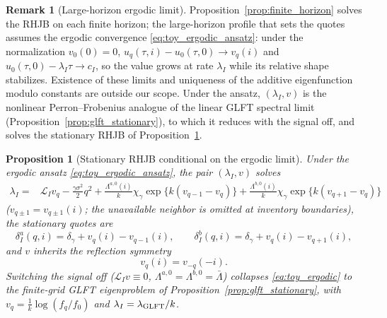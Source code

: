 \documentclass[11pt,a4paper]{article}
\newcommand{\Lcal}{\mathcal{L}}
\theoremstyle{plain}
\newtheorem{proposition}{Proposition}[section]
\theoremstyle{definition}
\newtheorem{remark}{Remark}[section]
\begin{document}
\begin{remark}[Large-horizon ergodic limit]
\label{rem:ergodic_existence}
Proposition~\ref{prop:finite_horizon} solves the RHJB on each finite horizon;
the large-horizon profile that sets the quotes assumes the ergodic convergence
\eqref{eq:toy_ergodic_ansatz}: under the normalization \(v_0(0)=0\),
\(u_q(\tau,i)-u_0(\tau,0)\to v_q(i)\) and \(u_0(\tau,0)-\lambda_I\tau\to c_I\),
so the value grows at rate \(\lambda_I\) while its relative shape stabilizes.
Existence of these limits and uniqueness of the additive eigenfunction modulo
constants are outside our scope.  Under the ansatz, \((\lambda_I,v)\) is the
nonlinear Perron--Frobenius analogue of the linear GLFT spectral limit
(Proposition~\ref{prop:glft_stationary}), to which it reduces with the signal
off, and solves the stationary RHJB of Proposition~\ref{prop:toy_ergodic}.
\end{remark}

\begin{proposition}[Stationary RHJB conditional on the ergodic limit]
\label{prop:toy_ergodic}
Under the ergodic ansatz \eqref{eq:toy_ergodic_ansatz}, the pair
\((\lambda_I,v)\) solves
\begin{align}
\lambda_I
={}&
\Lcal_Iv_q
-\frac{\gamma\sigma^2}{2}q^2
+\frac{\Lambda^{a,0}(i)}{k}\chi_\gamma\exp\{k(v_{q-1}-v_q)\}
+\frac{\Lambda^{b,0}(i)}{k}\chi_\gamma\exp\{k(v_{q+1}-v_q)\}
\label{eq:toy_ergodic}
\end{align}
(\(v_{q\pm1}=v_{q\pm1}(i)\); the unavailable neighbor is omitted at inventory
boundaries), the stationary quotes are
\begin{equation}
\delta_I^a(q,i)=\delta_\gamma+v_q(i)-v_{q-1}(i),
\qquad
\delta_I^b(q,i)=\delta_\gamma+v_q(i)-v_{q+1}(i),
\label{eq:toy_quote_recovery}
\end{equation}
and \(v\) inherits the reflection symmetry
\begin{equation}
v_q(i)=v_{-q}(-i).
\label{eq:toy_value_symmetry}
\end{equation}
Switching the signal off (\(\Lcal_I v\equiv0\),
\(\Lambda^{a,0}=\Lambda^{b,0}=\bar\Lambda\)) collapses \eqref{eq:toy_ergodic}
to the finite-grid GLFT eigenproblem of
Proposition~\ref{prop:glft_stationary}, with
\(v_q=\tfrac1k\log(f_q/f_0)\) and
\(\lambda_I=\lambda_{\rm GLFT}/k\).
\end{proposition}
\end{document}
